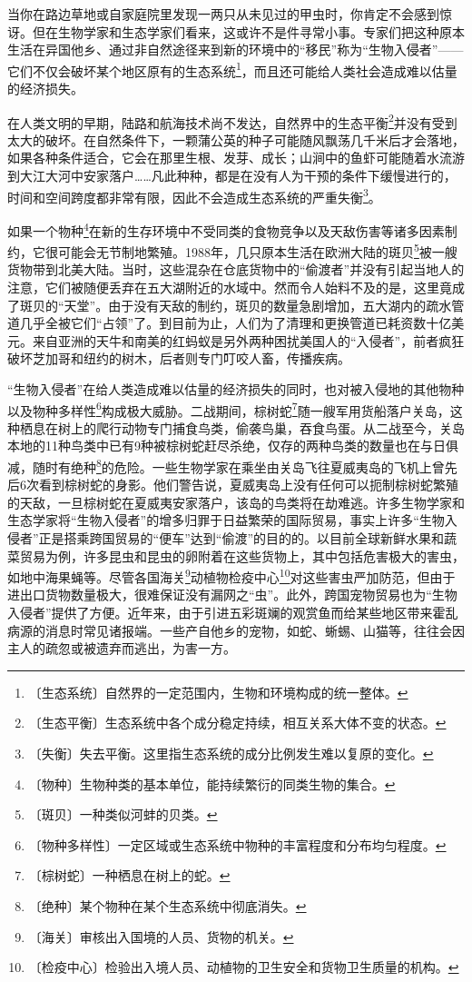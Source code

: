 \documentclass[12pt,UTF-8,openany]{ctexbook}
\begin{document}
\begin{large}
    
    当你在路边草地或自家庭院里发现一两只从未见过的甲虫时，你肯定不会感到惊讶。但在生物学家和生态学家们看来，这或许不是件寻常小事。专家们把这种原本生活在异国他乡、通过非自然途径来到新的环境中的“移民”称为“生物入侵者”——它们不仅会破坏某个地区原有的生态系统\footnote{〔生态系统〕自然界的一定范围内，生物和环境构成的统一整体。}，而且还可能给人类社会造成难以估量的经济损失。
    
    在人类文明的早期，陆路和航海技术尚不发达，自然界中的生态平衡\footnote{〔生态平衡〕生态系统中各个成分稳定持续，相互关系大体不变的状态。}并没有受到太大的破坏。在自然条件下，一颗蒲公英的种子可能随风飘荡几千米后才会落地，如果各种条件适合，它会在那里生根、发芽、成长；山涧中的鱼虾可能随着水流游到大江大河中安家落户……凡此种种，都是在没有人为干预的条件下缓慢进行的，时间和空间跨度都非常有限，因此不会造成生态系统的严重失衡\footnote{〔失衡〕失去平衡。这里指生态系统的成分比例发生难以复原的变化。}。
    
    如果一个物种\footnote{〔物种〕生物种类的基本单位，能持续繁衍的同类生物的集合。}在新的生存环境中不受同类的食物竞争以及天敌伤害等诸多因素制约，它很可能会无节制地繁殖。1988年，几只原本生活在欧洲大陆的斑贝\footnote{〔斑贝〕一种类似河蚌的贝类。}被一艘货物带到北美大陆。当时，这些混杂在仓底货物中的“偷渡者”并没有引起当地人的注意，它们被随便丢弃在五大湖附近的水域中。然而令人始料不及的是，这里竟成了斑贝的“天堂”。由于没有天敌的制约，斑贝的数量急剧增加，五大湖内的疏水管道几乎全被它们“占领”了。到目前为止，人们为了清理和更换管道已耗资数十亿美元。来自亚洲的天牛和南美的红蚂蚁是另外两种困扰美国人的“入侵者”，前者疯狂破坏芝加哥和纽约的树木，后者则专门叮咬人畜，传播疾病。
    
    “生物入侵者”在给人类造成难以估量的经济损失的同时，也对被入侵地的其他物种以及物种多样性\footnote{〔物种多样性〕一定区域或生态系统中物种的丰富程度和分布均匀程度。}构成极大威胁。二战期间，棕树蛇\footnote{〔棕树蛇〕一种栖息在树上的蛇。}随一艘军用货船落户关岛，这种栖息在树上的爬行动物专门捕食鸟类，偷袭鸟巢，吞食鸟蛋。从二战至今，关岛本地的11种鸟类中已有9种被棕树蛇赶尽杀绝，仅存的两种鸟类的数量也在与日俱减，随时有绝种\footnote{〔绝种〕某个物种在某个生态系统中彻底消失。}的危险。一些生物学家在乘坐由关岛飞往夏威夷岛的飞机上曾先后6次看到棕树蛇的身影。他们警告说，夏威夷岛上没有任何可以扼制棕树蛇繁殖的天敌，一旦棕树蛇在夏威夷安家落户，该岛的鸟类将在劫难逃。许多生物学家和生态学家将“生物入侵者”的增多归罪于日益繁荣的国际贸易，事实上许多“生物入侵者”正是搭乘跨国贸易的“便车”达到“偷渡”的目的的。以目前全球新鲜水果和蔬菜贸易为例，许多昆虫和昆虫的卵附着在这些货物上，其中包括危害极大的害虫，如地中海果蝇等。尽管各国海关\footnote{〔海关〕审核出入国境的人员、货物的机关。}动植物检疫中心\footnote{〔检疫中心〕检验出入境人员、动植物的卫生安全和货物卫生质量的机构。}对这些害虫严加防范，但由于进出口货物数量极大，很难保证没有漏网之“虫”。此外，跨国宠物贸易也为“生物入侵者”提供了方便。近年来，由于引进五彩斑斓的观赏鱼而给某些地区带来霍乱病源的消息时常见诸报端。一些产自他乡的宠物，如蛇、蜥蜴、山猫等，往往会因主人的疏忽或被遗弃而逃出，为害一方。
    

\end{large}
\end{document}
